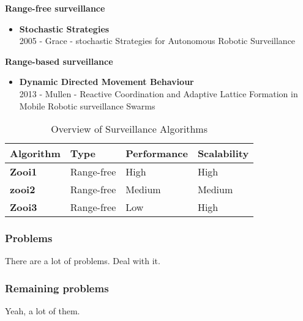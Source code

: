 \textbf{Range-free surveillance}
\begin{itemize}
\item \textbf{Stochastic Strategies}\\
	2005 - Grace - stochastic Strategies for Autonomous Robotic Surveillance
\end{itemize}

\textbf{Range-based surveillance}
\begin{itemize}
\item \textbf{Dynamic Directed Movement Behaviour}\\
	2013 - Mullen - Reactive Coordination and Adaptive Lattice Formation in Mobile Robotic surveillance Swarms
\end{itemize}

  \begin{table}[H]
  \renewcommand{\arraystretch}{1.3}
  \caption{Overview of Surveillance Algorithms}
  \label{table_example}
  \centering
    \begin{tabular}{|l|l|l|l|}
    \hline
    \bfseries Algorithm & \bfseries Type & \bfseries Performance & \bfseries Scalability\\
    \hline
    \bfseries Zooi1 & Range-free & High & High\\\hline
    \bfseries zooi2 & Range-free & Medium & Medium\\\hline
    \bfseries Zooi3 & Range-free & Low  & High\\\hline
    \end{tabular}
  \end{table}


\subsubsection{Problems}
There are a lot of problems. Deal with it. 


\subsubsection{Remaining problems}
Yeah, a lot of them. 












